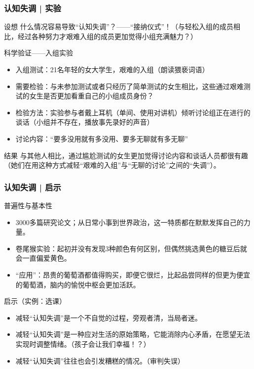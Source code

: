 \begin{frame}
  \frametitle{认知失调 | 实验}
  \begin{block}{设想}
什么情况容易导致“认知失调”？——“接纳仪式”！（与轻松入组的成员相比，经过各种努力才艰难入组的成员更加觉得小组充满魅力？）
  \end{block}
  \vspace{-0.6em}
  \pause
  \begin{block}{科学验证——入组实验}
    \begin{itemize}
      \item 入组测试：21名年轻的女大学生，艰难的入组（朗读猥亵词语）
      \item 需要检验：与未参加测试或者只经历了简单测试的女生相比，这些通过艰难测试的女生是否更加看重自己的小组成员身份？
      \item 检验方法：实验参与者戴上耳机（单间、使用对讲机）倾听讨论组正在进行的谈话（小组并不存在，播放事先录好的声音）
      \item 讨论内容：“要多没用就有多没用、要多无聊就有多无聊”
    \end{itemize}
  \end{block}
  \vspace{-0.6em}
  \pause
  \begin{block}{结果}
与其他人相比，通过尴尬测试的女生更加觉得讨论内容和谈话人员都很有趣（她们在用这种方式减轻“艰难的入组”与“无聊的讨论”之间的“失调”）。
  \end{block}
\end{frame}

\begin{frame}
  \frametitle{认知失调 | 启示}
  \begin{block}{普遍性与基本性}
    \begin{itemize}
      \item 3000多篇研究论文；从日常小事到世界政治，这一特质都在默默发挥自己的力量。
      \item 卷尾猴实验：起初并没有发现3种颜色有何区别，但偶然挑选黄色的糖豆后就会一直偏爱黄色。
      \item “应用”：昂贵的葡萄酒都值得购买，即便它很烂，比起品尝同样的但更为便宜的葡萄酒，脑内的愉悦中枢会更加活跃。
    \end{itemize}
  \end{block}
  \pause
  \begin{block}{启示（实例：选课）}
    \begin{itemize}
      \item 减轻“认知失调”是一个不自觉的过程，旁观者清，当局者迷。
      \item 减轻“认知失调”是一种应对生活的原始策略，它能消除内心矛盾，在愿望无法实现时调整情绪。（孩子会让我们幸福！？）
      \item 减轻“认知失调”往往也会引发糟糕的情况。（审判失误）
    \end{itemize}
  \end{block}
\end{frame}

